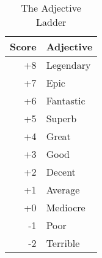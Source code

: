 
\begin{wraptable}{r}[1cm]{4cm}
\centering
\begin{tabular}{r@{:\quad}l}
\toprule
Score	& Adjective \\
\midrule
+8	& Legendary \\
+7	& Epic \\
+6	& Fantastic \\
+5	& Superb \\
+4	& Great \\
+3	& Good \\
+2	& Decent \\
+1	& Average \\
+0	& Mediocre \\
-1	& Poor \\
-2	& Terrible \\
\bottomrule
\end{tabular}
\caption{The Adjective Ladder}
\label{tab:the-ladder}
\end{wraptable}
